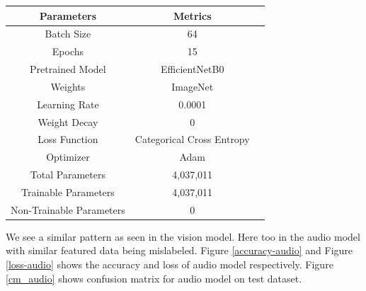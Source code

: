 \documentclass[fleqn, 10pt, twoside]{IOEGC}
\begin{document}
\begin{center}
	\begin{tabular}{ |c|c|c| }
		\hline
		\textbf{Parameters}      & \textbf{Metrics}          \\
		\hline
		Batch Size               & 64                        \\
		\hline
		Epochs                   & 15                        \\
		\hline
		Pretrained Model         & EfficientNetB0            \\
		\hline
		Weights                  & ImageNet                  \\
		\hline
		Learning Rate            & 0.0001                    \\
		\hline
		Weight Decay             & 0                         \\
		\hline
		Loss Function            & Categorical Cross Entropy \\
		\hline
		Optimizer                & Adam                      \\
		\hline
		Total Parameters         & 4,037,011                 \\
		\hline
		Trainable Parameters     & 4,037,011                 \\
		\hline
		Non-Trainable Parameters & 0                         \\
		\hline
	\end{tabular}
	\label{table:audio-model}
\end{center}
We see a similar pattern as seen in the vision model. Here too in the audio model with similar featured data being mislabeled. Figure \ref{accuracy-audio} and Figure \ref{loss-audio} shows the accuracy and loss of audio model respectively. Figure \ref{cm_audio} shows confusion matrix for audio model on test dataset.
\end{document}
